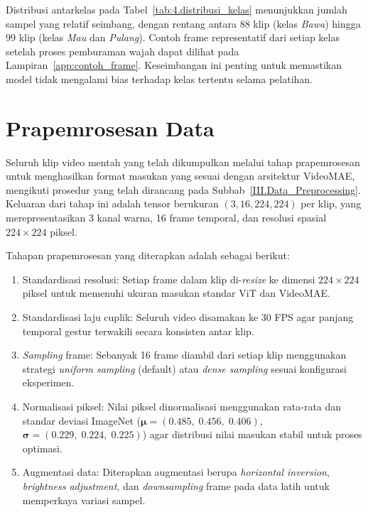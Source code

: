 Distribusi antarkelas pada Tabel~\ref{tab:4.distribusi_kelas} menunjukkan jumlah sampel yang relatif seimbang, dengan rentang antara 88 klip (kelas \textit{Bawa}) hingga 99 klip (kelas \textit{Mau} dan \textit{Pulang}). Contoh frame representatif dari setiap kelas setelah proses pemburaman wajah dapat dilihat pada Lampiran~\ref{app:contoh_frame}. Keseimbangan ini penting untuk memastikan model tidak mengalami bias terhadap kelas tertentu selama pelatihan.\par

\section{Prapemrosesan Data} \label{IV.Praproses}

Seluruh klip video mentah yang telah dikumpulkan melalui tahap prapemrosesan untuk menghasilkan format masukan yang sesuai dengan arsitektur VideoMAE, mengikuti prosedur yang telah dirancang pada Subbab~\ref{III.Data_Preprocessing}. Keluaran dari tahap ini adalah tensor berukuran $(3, 16, 224, 224)$ per klip, yang merepresentasikan 3 kanal warna, 16 frame temporal, dan resolusi spasial $224\times224$ piksel.\par

Tahapan prapemrosesan yang diterapkan adalah sebagai berikut:
\begin{enumerate}[noitemsep]
  \item Standardisasi resolusi: Setiap frame dalam klip di-\textit{resize} ke dimensi $224\times224$ piksel untuk memenuhi ukuran masukan standar ViT dan VideoMAE.
  \item Standardisasi laju cuplik: Seluruh video disamakan ke 30 FPS agar panjang temporal gestur terwakili secara konsisten antar klip.
  \item \textit{Sampling} frame: Sebanyak 16 frame diambil dari setiap klip menggunakan strategi \textit{uniform sampling} (default) atau \textit{dense sampling} sesuai konfigurasi eksperimen.
  \item Normalisasi piksel: Nilai piksel dinormalisasi menggunakan rata-rata dan standar deviasi ImageNet ($\boldsymbol{\mu}=(0.485,\;0.456,\;0.406)$, $\boldsymbol{\sigma}=(0.229,\;0.224,\;0.225)$) agar distribusi nilai masukan stabil untuk proses optimasi.
  \item Augmentasi data: Diterapkan augmentasi berupa \textit{horizontal inversion}, \textit{brightness adjustment}, dan \textit{downsampling} frame pada data latih untuk memperkaya variasi sampel.
\end{enumerate}

